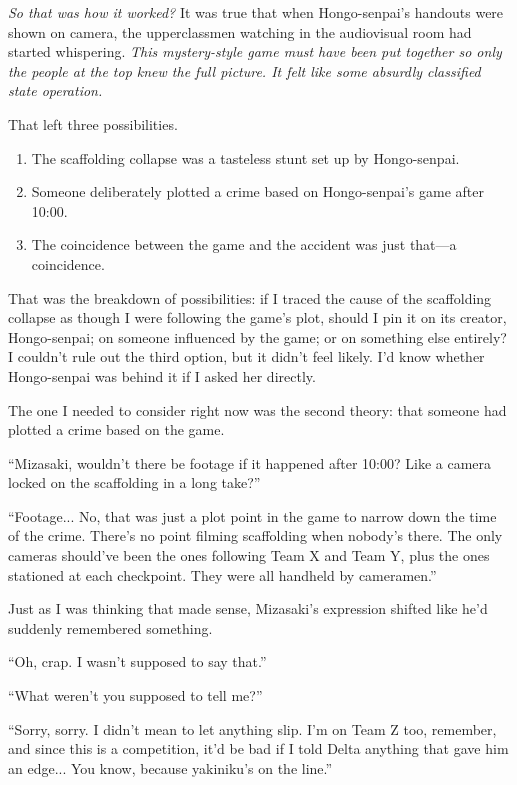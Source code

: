 \documentclass[
    a4paper,
    12pt,
    twoside,
    openany,
    UTF8,
    fontset=windows
]{ctexbook}
\begin{document}
\textit{So that was how it worked?} It was true that when Hongo-senpai's handouts were shown on camera, the upperclassmen watching in the audiovisual room had started whispering. \textit{This mystery-style game must have been put together so only the people at the top knew the full picture. It felt like some absurdly classified state operation.}

That left three possibilities.

\begin{enumerate}
\item The scaffolding collapse was a tasteless stunt set up by Hongo-senpai.
\item Someone deliberately plotted a crime based on Hongo-senpai's game after 10:00.
\item The coincidence between the game and the accident was just that---a coincidence.
\end{enumerate}

That was the breakdown of possibilities: if I traced the cause of the scaffolding collapse as though I were following the game's plot, should I pin it on its creator, Hongo-senpai; on someone influenced by the game; or on something else entirely? I couldn't rule out the third option, but it didn't feel likely. I'd know whether Hongo-senpai was behind it if I asked her directly.

The one I needed to consider right now was the second theory: that someone had plotted a crime based on the game.

``Mizasaki, wouldn't there be footage if it happened after 10:00? Like a camera locked on the scaffolding in a long take?''

``Footage... No, that was just a plot point in the game to narrow down the time of the crime. There's no point filming scaffolding when nobody's there. The only cameras should've been the ones following Team X and Team Y, plus the ones stationed at each checkpoint. They were all handheld by cameramen.''

Just as I was thinking that made sense, Mizasaki's expression shifted like he'd suddenly remembered something.

``Oh, crap. I wasn't supposed to say that.''

``What weren't you supposed to tell me?''

``Sorry, sorry. I didn't mean to let anything slip. I'm on Team Z too, remember, and since this is a competition, it'd be bad if I told Delta anything that gave him an edge... You know, because yakiniku's on the line.''
\end{document}
